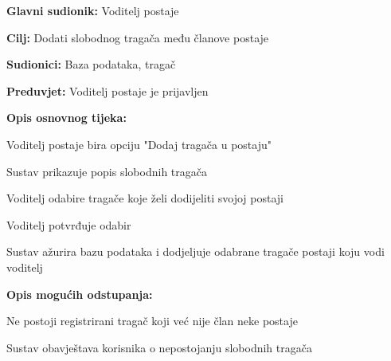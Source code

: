 					\noindent {}
					\begin{packed_item}
						
						\item \textbf{Glavni sudionik:} Voditelj postaje
						\item \textbf{Cilj:} Dodati slobodnog tragača među članove postaje
						\item \textbf{Sudionici:} Baza podataka, tragač
						\item \textbf{Preduvjet:} Voditelj postaje je prijavljen
						\item \textbf{Opis osnovnog tijeka:}
						
						\item[] \begin{packed_enum}
							
							\item Voditelj postaje bira opciju "Dodaj tragača u postaju" 
							\item Sustav prikazuje popis slobodnih tragača
							\item Voditelj odabire tragače koje želi dodijeliti svojoj postaji 
							\item Voditelj potvrđuje odabir 
							\item Sustav ažurira bazu podataka i dodjeljuje odabrane tragače postaji koju vodi voditelj
						\end{packed_enum}
						
						\item  \textbf{Opis mogućih odstupanja:}
						
						\item[] \begin{packed_item}
							
							\item[1.a] Ne postoji registrirani tragač koji već nije član neke postaje
							\item[] \begin{packed_enum}
								
								\item Sustav obavještava korisnika o nepostojanju slobodnih tragača
								
							\end{packed_enum}
							
						\end{packed_item}
					\end{packed_item}
					
					\eject
					
